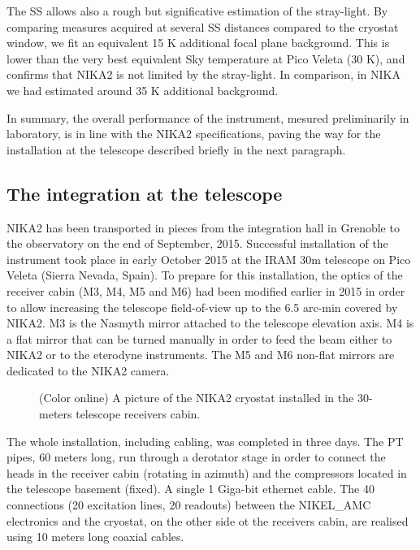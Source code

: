\documentclass[]{aa} %
\begin{document}
The SS allows also a rough but significative estimation of the stray-light. By comparing measures acquired at several SS distances compared to the cryostat window, we fit an equivalent 15 K additional focal plane background. This is lower than the very best equivalent Sky temperature at Pico Veleta (30 K), and confirms that NIKA2 is not limited by the stray-light. In comparison, in NIKA we had estimated around 35 K additional background. 

In summary, the overall performance of the instrument, mesured preliminarily in laboratory, is in line with the NIKA2 specifications, paving the way for the installation at the telescope described briefly in the next paragraph. 

\subsection{The integration at the telescope}

NIKA2 has been transported in pieces from the integration hall in Grenoble to the observatory on the end of September, 2015. Successful installation of the instrument took place in early October 2015 at the IRAM 30m telescope on Pico Veleta (Sierra Nevada, Spain). To prepare for this installation, the optics of the receiver cabin (M3, M4, M5 and M6) had been modified earlier in 2015 in order to allow increasing the telescope field-of-view up to the 6.5 arc-min covered by NIKA2. M3 is the Nasmyth mirror attached to the telescope elevation axis. M4 is a flat mirror that can be turned manually in order to feed the beam either to NIKA2 or to the eterodyne instruments. The M5 and M6 non-flat mirrors are dedicated to the NIKA2 camera. 

\begin{figure}[h]
   \centering
      \caption{(Color online) A picture of the NIKA2 cryostat installed in the 30-meters telescope receivers cabin.}
         \label{Fig5}
\end{figure}

The whole installation, including cabling, was completed in three days. The PT pipes, 60 meters long, run through a derotator stage in order to connect the heads in the receiver cabin (rotating in azimuth) and the compressors located in the telescope basement (fixed). A single 1 Giga-bit ethernet cable. The 40 connections (20 excitation lines, 20 readouts) between the NIKEL\_AMC electronics and the cryostat, on the other side ot the receivers cabin, are realised using 10 meters long coaxial cables. 
\end{document}
